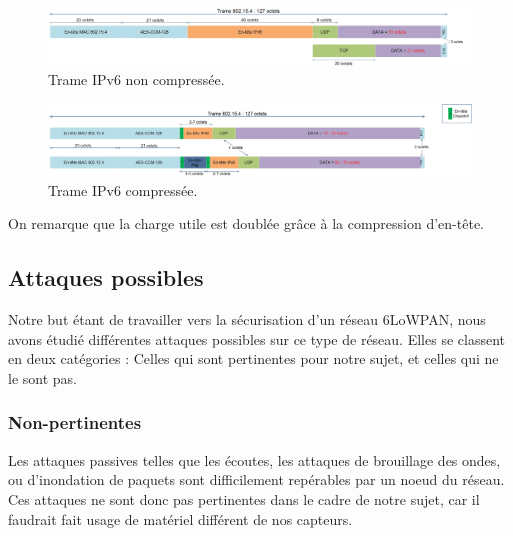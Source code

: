 		\begin{figure}[htp]
			\centering
			\includegraphics[width=16cm]{images/TramePasComp.jpg}
			\caption{Trame IPv6 non compressée.}
			\label{fig:tramepascomp}
		\end{figure}
		
		\begin{figure}[htp]
			\centering
			\includegraphics[width=17cm]{images/TrameComp.jpg}
			\caption{Trame IPv6 compressée.}
			\label{fig:tramecomp}
		\end{figure}
		On remarque que la charge utile est doublée grâce à la compression d'en-tête.
%	
	\subsection{Attaques possibles}
		Notre but étant de travailler vers la sécurisation d'un réseau 6LoWPAN, nous avons étudié différentes attaques possibles sur ce type de réseau. Elles se classent en deux catégories : Celles qui sont pertinentes pour notre sujet, et celles qui ne le sont pas.\\
		
		\subsubsection{Non-pertinentes}
			Les attaques passives telles que les écoutes, les attaques de brouillage des ondes, ou d'inondation de paquets sont difficilement repérables par un noeud du réseau. Ces attaques ne sont donc pas pertinentes dans le cadre de notre sujet, car il faudrait fait usage de matériel différent de nos capteurs.
